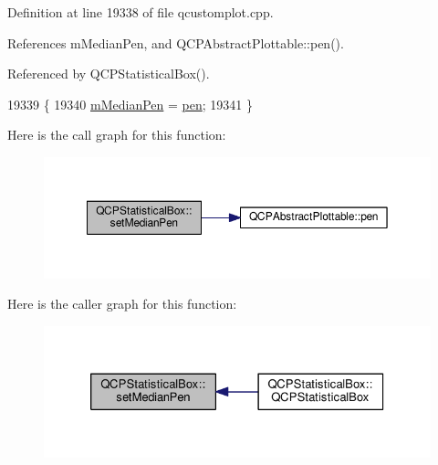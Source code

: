 Definition at line 19338 of file qcustomplot.\+cpp.



References m\+Median\+Pen, and Q\+C\+P\+Abstract\+Plottable\+::pen().



Referenced by Q\+C\+P\+Statistical\+Box().


\begin{DoxyCode}
19339 \{
19340   \hyperlink{class_q_c_p_statistical_box_a1af5b601049c575f778ae270f40c9443}{mMedianPen} = \hyperlink{class_q_c_p_abstract_plottable_a41d060007cc6b3037c9c04d22d0c0398}{pen};
19341 \}
\end{DoxyCode}


Here is the call graph for this function\+:\nopagebreak
\begin{figure}[H]
\begin{center}
\leavevmode
\includegraphics[width=350pt]{class_q_c_p_statistical_box_a7260ac55b669f5d0a74f16d5ca84c52c_cgraph}
\end{center}
\end{figure}




Here is the caller graph for this function\+:\nopagebreak
\begin{figure}[H]
\begin{center}
\leavevmode
\includegraphics[width=326pt]{class_q_c_p_statistical_box_a7260ac55b669f5d0a74f16d5ca84c52c_icgraph}
\end{center}
\end{figure}


\hypertarget{class_q_c_p_statistical_box_a84ff7cc61ba44890f0c3e0c99c19941e}{}
